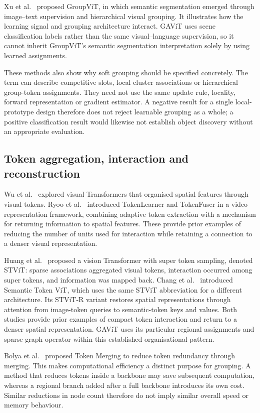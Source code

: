 Xu et al.~\cite{xu2022groupvit} proposed GroupViT, in which semantic
segmentation emerged through image--text supervision and hierarchical visual
grouping. It illustrates how the learning signal and grouping architecture
interact. GAViT uses scene classification labels rather than the same
visual--language supervision, so it cannot inherit GroupViT's semantic
segmentation interpretation solely by using learned assignments.

These methods also show why soft grouping should be specified concretely.
The term can describe competitive slots, local cluster associations or
hierarchical group-token assignments. They need not use the same update
rule, locality, forward representation or gradient estimator. A negative
result for a single local-prototype design therefore does not reject
learnable grouping as a whole; a positive classification result would
likewise not establish object discovery without an appropriate evaluation.

\subsection{Token aggregation, interaction and reconstruction}

Wu et al.~\cite{wu2020visualtransformers} explored visual Transformers that
organised spatial features through visual tokens. Ryoo
et al.~\cite{ryoo2021tokenlearner} introduced TokenLearner and TokenFuser in
a video representation framework, combining adaptive token extraction with
a mechanism for returning information to spatial features. These provide
prior examples of reducing the number of units used for interaction while
retaining a connection to a denser visual representation.

Huang et al.~\cite{huang2023stvit} proposed a vision Transformer with super
token sampling, denoted STViT: sparse associations aggregated visual tokens,
interaction occurred among super tokens, and information was mapped back.
Chang et al.~\cite{chang2023semanticstvit} introduced Semantic Token ViT,
which uses the same STViT abbreviation for a different architecture. Its
STViT-R variant restores spatial representations through attention from
image-token queries to semantic-token keys and values. Both studies provide
prior examples of compact token interaction and return to a denser spatial
representation. GAViT uses its particular regional assignments and sparse
graph operator within this established organisational pattern.

Bolya et al.~\cite{bolya2023tome} proposed Token Merging to reduce token
redundancy through merging. This makes computational efficiency a distinct
purpose for grouping. A method that reduces tokens inside a backbone may
save subsequent computation, whereas a regional branch added after a full
backbone introduces its own cost. Similar reductions in node count therefore
do not imply similar overall speed or memory behaviour.

